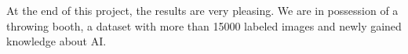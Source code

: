 At the end of this project, the results are very pleasing.
We are in possession of a throwing booth, a dataset with more than \num{15000} labeled images and newly gained knowledge about AI.
